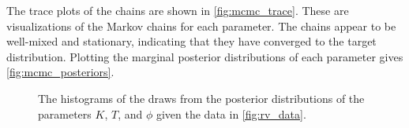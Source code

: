 \documentclass[preprint,longauthor]{aastex631}
\numberwithin{equation}{section}
\begin{document}
The trace plots of the chains are shown in \autoref{fig:mcmc_trace}. These are visualizations of the Markov chains for each parameter. The chains appear to be well-mixed and stationary, indicating that they have converged to the target distribution. Plotting the marginal posterior distributions of each parameter gives \autoref{fig:mcmc_posteriors}.

\begin{figure}[ht!]
\centering

\hfill
{}
\hfill
{}
\caption{The histograms of the draws from the posterior distributions of the parameters $K$, $T$, and $\phi$ given the data in \autoref{fig:rv_data}.}
\label{fig:mcmc_posteriors}
\end{figure}
\end{document}
